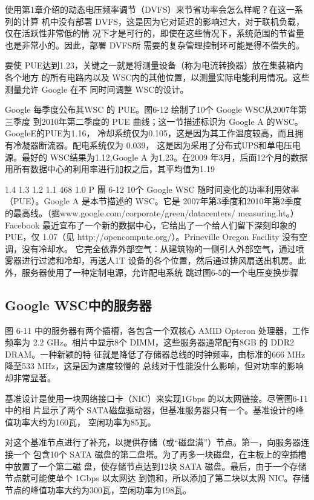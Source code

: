 使用第1章介绍的动态电压频率调节（DVFS）来节省功率会怎么样呢？在这一系列的计算
机中没有部署 DVFS，这是因为它对延迟的影响过大，对于联机负载，仅在活跃性非常低的情
况下才是可行的，即使在这些情况下，系统范围的节省量也是非常小的。因此，部署 DVFS所
需要的复杂管理控制环可能是得不偿失的。

要使 PUE达到1.23，关键之一就是将测量设备（称为电流转換器）放在集装箱内各个地方
的所有电路内以及 WSC内的其他位置，以测量实际电能利用情况。这些测量允许 Google 在不
同时间调整 WSC的设计。

Google 每季度公布其WSC 的 PUE。图6-12 绘制了10个 Google WSC从2007年第三季度
到2010年第二季度的 PUE 曲线；这一节描述标识为 Google A 的WSC。GoogleE的PUE为1.16，
冷却系统仅为0.105，这是因为其工作温度较高，而且拥有冷凝器断流器。配电系统仅为 0.039，
这是因为采用了分布式UPS和单电压电源。最好的 WSC结果为1.12,Google A 为1.23。在2009
年3月，后面12个月的数据用所有数据中心的利用率进行加权之后，其平均值为1.19

1.4
1.3
1.2
1.1
468
1.0
P
團 6-12 10个 Google WSC 随时间变化的功率利用效率（PUE）。Google A 是本节描述的 WSC。它是
2007年第3季度和2010年第2季度的最高线。（据www.google.com/corporate/green/datacenters/
measuring.ht。）Facebook 最近宜布了一个新的数据中心，它给出了一个给人们留下深刻印象的
PUE，仅 1.07（见 http://opencompute.org/）。Prineville Oregon Facility 没有空调，没有冷却水。
它完全依靠外部空气：从建筑物的一侧引人外部空气，通过喷雾器进行过滤和冷却，再送人1T
设备的各个位置，然后通过排风扇送出机房。此外，服务器使用了一种定制电源，允许配电系统
跳过图6-5的一个电压变换步骤

\subsection{Google WSC中的服务器}
图 6-11 中的服务器有两个插槽，各包含一个双核心 AMID Opteron 处理器，工作频率为
2.2 GHz。相片中显示8个 DIMM，这些服务器通常配有8GB 的 DDR2 DRAM。一种新颖的特
征就是降低了存储器总线的时钟频率，由标准的666 MHz降至533 MHz，这是因为速度较慢的
总线对于性能没什么影响，但对功率的影响却非常显著。

基准设计是使用一块网络接口卡（NIC）来实现1Gbps 的以太网链接。尽管图6-11 中的相
片显示了两个 SATA磁盘驱动器，但基准服务器只有一个。基准设计的峰值功率大约为160瓦，
空闲功率为85瓦。

对这个基准节点进行了补充，以提供存储（或“磁盘满”）节点。第一，向服务器连接一个
包含10个 SATA 磁盘的第二盘塔。为了再多一块磁盘，在主板上的空插槽中放置了一个第二磁
盘，使存储节点达到12块 SATA 磁盘。最后，由于一个存储节点就可能使单个 1Gbps 以太网达
到饱和，所以添加了第二块以太网 NIC。存储节点的峰值功率大约为300瓦，空闲功率为198瓦。

